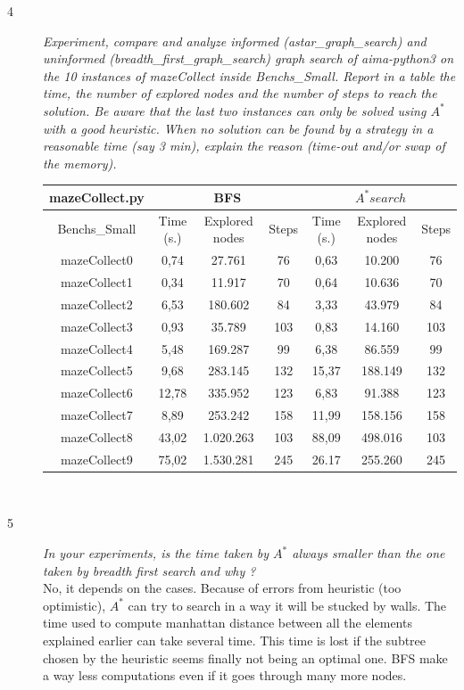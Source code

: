 \begin{description}
\item [4] \textit{Experiment, compare and analyze informed (astar\_graph\_search) and uninformed (breadth\_first\_graph\_search) graph search of aima-python3 on the 10 instances of mazeCollect inside Benchs\_Small. Report in a table the time, the number of explored nodes and the number of steps to reach the solution. Be aware that the last two instances can only be solved using $A^\ast$ with a good heuristic. When no solution can be found by a strategy in a reasonable time (say 3 min), explain the reason (time-out and/or swap of the memory).} \\

\begin{tabular}{|c|c|c|c|c|c|c|} \hline  mazeCollect.py & \multicolumn{3}{c|}{BFS} & \multicolumn{3}{c|}{$A^\ast search$} \\ 
\hline Benchs\_Small & Time (s.) & Explored nodes & Steps & Time (s.) & Explored nodes & Steps \\ \hline 
mazeCollect0 & 0,74 & 27.761 & 76 & 0,63 & 10.200 & 76\\
mazeCollect1 & 0,34 & 11.917 & 70 & 0,64 & 10.636 & 70 \\  
mazeCollect2 & 6,53 & 180.602 & 84 & 3,33 & 43.979 & 84\\
mazeCollect3 & 0,93 & 35.789 & 103 & 0,83 & 14.160 & 103\\
mazeCollect4 & 5,48 & 169.287 & 99 & 6,38 & 86.559 & 99\\
mazeCollect5 & 9,68 & 283.145 & 132 & 15,37 & 188.149 & 132 \\
mazeCollect6 & 12,78 & 335.952 & 123 & 6,83 & 91.388 & 123\\
mazeCollect7 & 8,89 & 253.242 & 158 & 11,99 & 158.156 & 158\\
mazeCollect8 & 43,02 & 1.020.263 & 103 & 88,09 & 498.016 & 103\\
mazeCollect9 & 75,02 & 1.530.281 & 245 & 26.17 & 255.260 & 245\\
\hline
\end{tabular}\\

\item [5] \textit{In your experiments, is the time taken by $A^\ast$ always smaller than the one taken by breadth first search and why ?} \\

No, it depends on the cases. Because of errors from heuristic (too optimistic), $A^\ast$ can try to search in a way it will be stucked by walls. The time used to compute manhattan distance between all the elements explained earlier can take several time. This time is lost if the subtree chosen by the heuristic seems finally not being an optimal one. BFS make a way less computations even if it goes through many more nodes.


\end{description}
